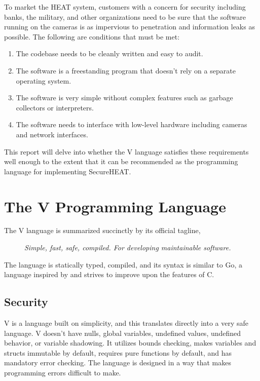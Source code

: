 \documentclass[letterpaper,twocolumn,10pt]{article}
\begin{document}
To market the HEAT system, customers with a concern for security including banks, the military, and other organizations need to be sure that the software running on the cameras is as impervious to penetration and information leaks as possible. The following are conditions that must be met:
\begin{enumerate}
    \item The codebase needs to be cleanly written and easy to audit.
    \item The software is a freestanding program that doesn't rely on a separate operating system.
    \item The software is very simple without complex features such as garbage collectors or interpreters.
    \item The software needs to interface with low-level hardware including cameras and network interfaces.
\end{enumerate}

This report will delve into whether the V language satisfies these requirements well enough to the extent that it can be recommended as the programming language for implementing SecureHEAT.

\section{The V Programming Language}
The V language is summarized succinctly by its official tagline,
\begin{description}
    \item[] \textit{Simple, fast, safe, compiled. For developing maintainable software.}~\cite{vlang}
\end{description}
The language is statically typed, compiled, and its syntax is similar to Go, a language inspired by and strives to improve upon the features of C.

\subsection{Security}
V is a language built on simplicity, and this translates directly into a very safe language. V doesn't have nulls, global variables, undefined values, undefined behavior, or variable shadowing. It utilizes bounds checking, makes variables and structs immutable by default, requires pure functions by default, and has mandatory error checking. The language is designed in a way that makes programming errors difficult to make. 
\end{document}
